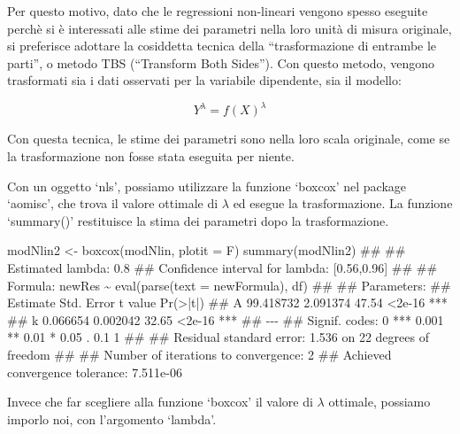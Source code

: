 \documentclass[a4paper,12pt,oneside]{book}
\newenvironment{Shaded}{\begin{snugshade}}{\end{snugshade}}
\newcommand{\DocumentationTok}[1]{#1}
\newcommand{\OtherTok}[1]{#1}
\newcommand{\FunctionTok}[1]{#1}
\newcommand{\AttributeTok}[1]{#1}
\newcommand{\NormalTok}[1]{#1}
\begin{document}
Per questo motivo, dato che le regressioni non-lineari vengono spesso eseguite perchè si è interessati alle stime dei parametri nella loro unità di misura originale, si preferisce adottare la cosiddetta tecnica della ``trasformazione di entrambe le parti'', o metodo TBS (``Transform Both Sides''). Con questo metodo, vengono trasformati sia i dati osservati per la variabile dipendente, sia il modello:

\[Y^\lambda  = f(X)^\lambda\]

Con questa tecnica, le stime dei parametri sono nella loro scala originale, come se la trasformazione non fosse stata eseguita per niente.

Con un oggetto `nls', possiamo utilizzare la funzione `boxcox' nel package `aomisc', che trova il valore ottimale di \(\lambda\) ed esegue la trasformazione. La funzione `summary()' restituisce la stima dei parametri dopo la trasformazione.

\begin{Shaded}
\begin{Highlighting}[]
\NormalTok{modNlin2 }\OtherTok{\textless{}{-}} \FunctionTok{boxcox}\NormalTok{(modNlin, }\AttributeTok{plotit =}\NormalTok{ F)}
\FunctionTok{summary}\NormalTok{(modNlin2)}
\DocumentationTok{\#\# }
\DocumentationTok{\#\# Estimated lambda: 0.8 }
\DocumentationTok{\#\# Confidence interval for lambda: [0.56,0.96]}
\DocumentationTok{\#\# }
\DocumentationTok{\#\# Formula: newRes \textasciitilde{} eval(parse(text = newFormula), df)}
\DocumentationTok{\#\# }
\DocumentationTok{\#\# Parameters:}
\DocumentationTok{\#\#    Estimate Std. Error t value Pr(\textgreater{}|t|)    }
\DocumentationTok{\#\# A 99.418732   2.091374   47.54   \textless{}2e{-}16 ***}
\DocumentationTok{\#\# k  0.066654   0.002042   32.65   \textless{}2e{-}16 ***}
\DocumentationTok{\#\# {-}{-}{-}}
\DocumentationTok{\#\# Signif. codes:  0 \textquotesingle{}***\textquotesingle{} 0.001 \textquotesingle{}**\textquotesingle{} 0.01 \textquotesingle{}*\textquotesingle{} 0.05 \textquotesingle{}.\textquotesingle{} 0.1 \textquotesingle{} \textquotesingle{} 1}
\DocumentationTok{\#\# }
\DocumentationTok{\#\# Residual standard error: 1.536 on 22 degrees of freedom}
\DocumentationTok{\#\# }
\DocumentationTok{\#\# Number of iterations to convergence: 2 }
\DocumentationTok{\#\# Achieved convergence tolerance: 7.511e{-}06}
\end{Highlighting}
\end{Shaded}

Invece che far scegliere alla funzione `boxcox' il valore di \(\lambda\) ottimale, possiamo imporlo noi, con l'argomento `lambda'.
\end{document}
